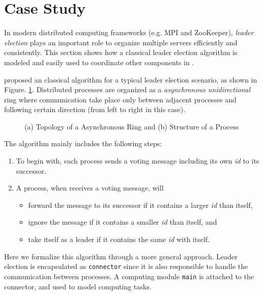 \section{Case Study}
\label{sec:casestudy}

In modern distributed computing frameworks (e.g. MPI and ZooKeeper), \emph{leader election} plays an important role to organize multiple servers efficiently and consistently. This section shows how a classical leader election algorithm is modeled and easily used to coordinate other components in \lang{}.

  \cite{HagitDistributed2004} proposed an classical algorithm for a typical leader election scenario, as shown in Figure. \ref{fig:leaderelection}. Distributed processes are organized as a \emph{asynchronous unidirectional} ring where communication take place only between adjacent processes and following certain direction (from left to right in this case).

\begin{figure}
	\centering
	\resizebox{.8\textwidth}{!}{
        
    }
	\caption{(a) Topology of a Asynchronous Ring and (b) Structure of a Process}
	\label{fig:leaderelection}
\end{figure}

The algorithm mainly includes the following steps:
\begin{enumerate}
	\item To begin with, each process sends a voting message including its own \emph{id} to its successor.
	\item A process, when receives a voting message, will
	\begin{itemize}
		\item forward the message to its successor if it contains a larger \emph{id} than itself,
		\item ignore the message if it contains a smaller \emph{id} than itself, and
		\item take itself as a leader if it contains the same \emph{id} with itself.
	\end{itemize} 
\end{enumerate}

Here we formalize this algorithm through a more general approach. Leader election is encapsulated as \texttt{connector} since it is also responsible to handle the communication between processes. A computing module \texttt{main} is attached to the connector, and used to model computing tasks. 

